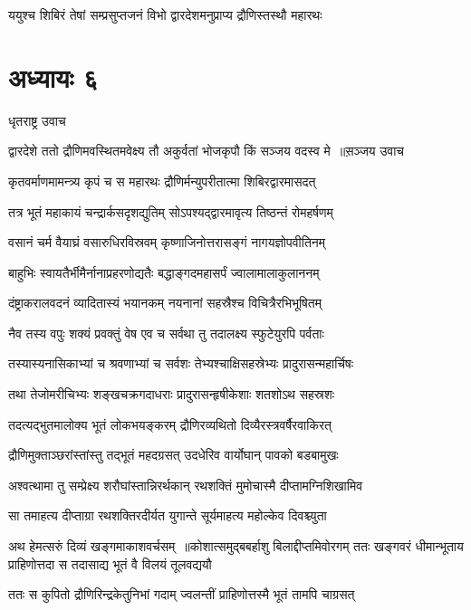 \twolineshloka
{ययुश्च शिबिरं तेषां सम्प्रसुप्तजनं विभो}
{द्वारदेशमनुप्राप्य द्रौणिस्तस्थौ महारथः}


\chapter{अध्यायः ६}
\twolineshloka
{धृतराष्ट्र उवाच}
{}


\threelineshloka
{द्वारदेशे ततो द्रौणिमवस्थितमवेक्ष्य तौ}
{अकुर्वतां भोजकृपौ किं सञ्जय वदस्व मे ॥स़ञ्जय उवाच}
{}


\twolineshloka
{कृतवर्माणमामन्त्र्य कृपं च स महारथः}
{द्रौणिर्मन्युपरीतात्मा शिबिरद्वारमासदत्}


\twolineshloka
{तत्र भूतं महाकायं चन्द्रार्कसदृशद्युतिम्}
{सोऽपश्यद्द्वारमावृत्य तिष्ठन्तं रोमहर्षणम्}


\twolineshloka
{वसानं चर्म वैयाघ्रं वसारुधिरविस्रवम्}
{कृष्णाजिनोत्तरासङ्गं नागयज्ञोपवीतिनम्}


\twolineshloka
{बाहुभिः स्वायतैर्भीमैर्नानाप्रहरणोद्यतैः}
{बद्धाङ्गदमहासर्पं ज्वालामालाकुलाननम्}


\twolineshloka
{दंष्ट्राकरालवदनं व्यादितास्यं भयानकम्}
{नयनानां सहस्रैश्च विचित्रैरभिभूषितम्}


\twolineshloka
{नैव तस्य वपुः शक्यं प्रवक्तुं वेष एव च}
{सर्वथा तु तदालक्ष्य स्फुटेयुरपि पर्वताः}


\twolineshloka
{तस्यास्यनासिकाभ्यां च श्रवणाभ्यां च सर्वशः}
{तेभ्यश्चाक्षिसहस्रेभ्यः प्रादुरासन्महार्चिषः}


\twolineshloka
{तथा तेजोमरीचिभ्यः शङ्खचक्रगदाधराः}
{प्रादुरासन्हृषीकेशाः शतशोऽथ सहस्रशः}


\twolineshloka
{तदत्यद्भुतमालोक्य भूतं लोकभयङ्करम्}
{द्रौणिरव्यथितो दिव्यैरस्त्रवर्षैरवाकिरत्}


\twolineshloka
{द्रौणिमुक्ताञ्छरांस्तांस्तु तद्भूतं महदग्रसत्}
{उदधेरिव वार्योघान् पावको बडबामुखः}


\twolineshloka
{अश्वत्थामा तु सम्प्रेक्ष्य शरौघांस्तान्निरर्थकान्}
{रथशक्तिं मुमोचास्मै दीप्तामग्निशिखामिव}


\twolineshloka
{सा तमाहत्य दीप्ताग्रा रथशक्तिरदीर्यत}
{युगान्ते सूर्यमाहत्य महोल्केव दिवश्च्युता}


अथ हेमत्सरुं दिव्यं खङ्गमाकाशवर्चसम् ॥कोशात्समुद्बबर्हाशु बिलाद्दीप्तमिवोरगम्
\twolineshloka
{ततः खङ्गवरं धीमान्भूताय प्राहिणोत्तदा}
{स तदासाद्य भूतं वै विलयं तूलवद्ययौ}


\twolineshloka
{ततः स कुपितो द्रौणिरिन्द्रकेतुनिभां गदाम्}
{ज्वलन्तीं प्राहिणोत्तस्मै भूतं तामपि चाग्रसत्}



